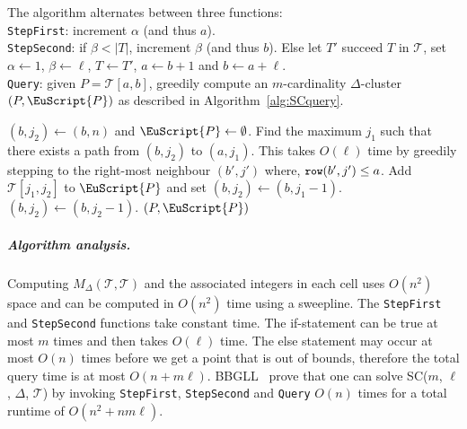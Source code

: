 \documentclass[11pt]{article}
\newcommand{\fancy}[1]{\EuScript{#1}}
\newcommand{\minrow}{\texttt{\small row}}
\newcommand{\pathlet}{cluster\xspace}
\begin{document}
The algorithm alternates between three functions: \\
%
 \texttt{StepFirst}: increment $\alpha$ (and thus $a$).\\
%
\texttt{StepSecond}: if $\beta < |T|$, increment $\beta$ (and thus $b$). 
%
%
Else let $T'$ succeed $T$ in $\mathcal{T}$, set $\alpha \gets 1$, $\beta \gets \ell$, $T \gets T'$, $a \gets b + 1$ and $b \gets a + \ell$. \\
%
 \texttt{Query}: given $P = \mathcal{T}[a, b]$, greedily compute an $m$-cardinality $\Delta$-\pathlet $(P, {\fancy{P}})$ as {described in Algorithm~\ref{alg:SCquery}}. 
%
%
 \begin{algorithm}[h]
    \caption{\texttt{Query}($P = \mathcal{T}[a, b]$, $m$, $\ell$, $\Delta$, $\mathcal{T})$ by~\cite{buchin2011detecting}}
   \label{alg:SCquery}
    \begin{algorithmic}
    \State $(b, j_2) \gets (b, n)$ and ${\fancy{P}} \gets \emptyset$. 
    \While{$|{\fancy{P}}| < m$ and $j_2 > 0$} 
    \If{$\minrow(b, j_2) \leq a$}
    \State Find the maximum $j_1$ such that there exists a path from $(b, j_2)$ to $(a, j_1)$. 
    \State This takes $O(\ell)$ time by greedily stepping to the right-most neighbour 
    $(b', j')$ where,
    \State $\minrow(b', j') \leq a$.
    \State Add    
    $\mathcal{T}[j_1, j_2]$ to ${\fancy{P}}$ and set $(b, j_2) \gets (b, j_1 - 1)$.
    \Else 
    \State $(b, j_2) \gets (b, j_2 - 1)$. 
    \EndIf
    \EndWhile
    \If{$|{\fancy{P}}| \geq m$}
   \State  \Return $(P, {\fancy{P}})$
    \EndIf
    \end{algorithmic}
  \end{algorithm}
%
%
%
%
%
 \subparagraph{Algorithm analysis.}
 Computing $M_\Delta(\mathcal{T}, \mathcal{T})$ and the associated integers in each cell uses $O(n^2)$ space and can be computed in $O(n^2)$ time using a sweepline. 
%
  The \texttt{StepFirst} and \texttt{StepSecond} functions take constant time. 
 The if-statement can be true at most $m$ times and then takes  $O(\ell)$ time. The else statement may occur at most $O(n)$ times before we get a point that is out of bounds, therefore the total query time  is at most $O(n + m \ell)$. 
 BBGLL~\cite{buchin2011detecting} prove that one can solve SC($m$, $\ell$, $\Delta$, $\mathcal{T}$) by invoking \texttt{StepFirst}, \texttt{StepSecond} and \texttt{Query} $O(n)$ times for a total runtime of $O(n^2 + n m \ell)$. 
%
\end{document}
